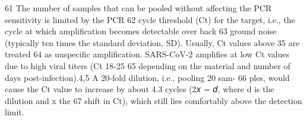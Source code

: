 61 The number of samples that can be pooled without affecting the PCR sensitivity is limited by the PCR
62 cycle threshold (Ct) for the target, i.e., the cycle at which amplification becomes detectable over back
63 ground noise (typically ten times the standard deviation, SD). Usually, Ct values above 35 are treated
64 as unspecific amplification. SARS-CoV-2 amplifies at low Ct values due to high viral titers (Ct 18-25
65 depending on the material and number of days post-infection).4,5 A 20-fold dilution, i.e., pooling 20 sam-
66 ples, would cause the Ct value to increase by about 4.3 cycles (2𝑥 = 𝑑, where d is the dilution and x the
67 shift in Ct), which still lies comfortably above the detection limit.